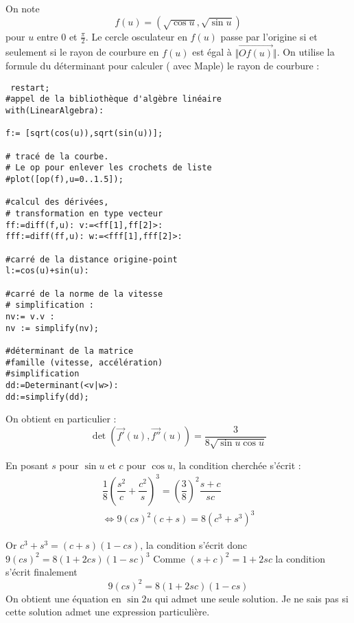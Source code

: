 On note 
\begin{displaymath}
 f(u) = (\sqrt{\cos u }, \sqrt{\sin u })
\end{displaymath}
pour $u$ entre $0$ et $\frac{\pi}{2}$. Le cercle osculateur en $f(u)$ passe par l'origine si et seulement si le rayon de courbure en $f(u)$ est égal à $\Vert \overrightarrow{Of(u)}\Vert$.\newline
On utilise la formule du déterminant pour calculer ( avec Maple) le rayon de courbure :
\begin{verbatim}
 restart;
#appel de la bibliothèque d'algèbre linéaire
with(LinearAlgebra):

f:= [sqrt(cos(u)),sqrt(sin(u))];

# tracé de la courbe.
# Le op pour enlever les crochets de liste
#plot([op(f),u=0..1.5]);

#calcul des dérivées,
# transformation en type vecteur  
ff:=diff(f,u): v:=<ff[1],ff[2]>:
fff:=diff(ff,u): w:=<fff[1],fff[2]>:

#carré de la distance origine-point
l:=cos(u)+sin(u):

#carré de la norme de la vitesse
# simplification :
nv:= v.v :
nv := simplify(nv);

#déterminant de la matrice 
#famille (vitesse, accélération)
#simplification
dd:=Determinant(<v|w>):
dd:=simplify(dd);
\end{verbatim} 

On obtient en particulier :
\begin{displaymath}
 \det(\overrightarrow{f'}(u),\overrightarrow{f''}(u))
=\dfrac{3}{8\sqrt{\sin u \cos u}}
\end{displaymath}

En posant $s$ pour $\sin u$ et $c$ pour $\cos u$, la condition cherchée s'écrit :
\begin{multline*}
 \dfrac{1}{8}\left(\dfrac{s^2}{c}+\dfrac{c^2}{s} \right)^3=
 \left( \dfrac{3}{8}\right)^2\dfrac{s+c}{sc} \\
\Leftrightarrow
9(cs)^2(c+s)=8(c^3+s^3)^3 
\end{multline*}

Or $c^3+s^3 = (c+s)(1-cs)$, la condition s'écrit donc
$9(cs)^2 = 8 (1+2cs)(1-sc)^3$ Comme $(s+c)^2 = 1+2sc$ la condition s'écrit finalement
\begin{displaymath}
 9(cs)^2=8(1+2sc)(1-cs)
\end{displaymath}
On obtient une équation en $\sin 2u$ qui admet une seule solution. Je ne sais pas si cette solution admet une expression particulière.
